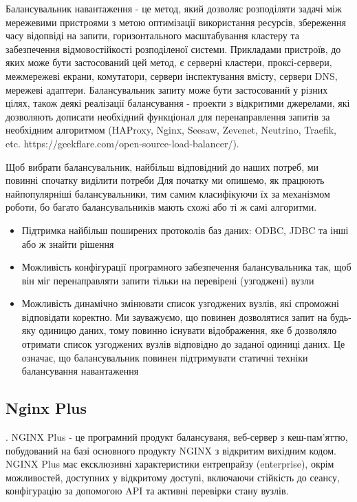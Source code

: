 \documentclass[14pt]{vakthesis}
\begin{document}
Балансувальник навантаження - це метод, який дозволяє розподіляти задачі між мережевими пристроями з метою оптимізації використання ресурсів, збереження часу відопвіді на запити, горизонтального масштабування кластеру та забезпечення відмовостійкості розподіленої системи. Прикладами пристроїв, до яких може бути застосований цей метод, є серверні кластери, проксі-сервери, межмережеві екрани, комутатори, сервери інспектування вмісту, сервери DNS, мережеві адаптери. Балансувальник запиту може бути застосований у різних цілях, також деякі реалізації балансування - проекти з відкритими джерелами, які дозволяють дописати необхідний функціонал для перенаправлення запитів за необхідним алгоритмом (HAProxy, Nginx, Seesaw, Zevenet, Neutrino, Traefik, etc. https://geekflare.com/open-source-load-balancer/).


Щоб вибрати балансувальник, найбільш відповідний до наших потреб, ми повинні спочатку виділити потреби Для початку ми опишемо, як працюють найпопулярніші балансувальники, тим самим класифікуючи їх за механізмом роботи, бо багато балансувальників мають схожі або ті ж самі алгоритми. 
\begin{itemize}
\item Підтримка найбільш поширених протоколів баз даних: ODBC, JDBC та інші або ж знайти рішення 
\item Можливість конфігурації програмного забезпечення балансувальника так, щоб він міг перенаправляти запити тільки на перевірені (узгоджені) вузли
\item Можливість динамічно змінювати список узгоджених вузлів, які спроможні відповідати коректно. Ми зауважуємо, що повинен дозволятися запит на будь-яку одиницю даних, тому повинно існувати відображення, яке б дозволяло отримати список узгоджених вузлів відповідно до заданої одиниці даних. Це означає, що балансувальник повинен підтримувати статичні техніки балансування навантаження
\end{itemize}



\subsection{Nginx Plus}. NGINX Plus - це програмний продукт балансуваня, веб-сервер з кеш-пам'яттю, побудований на базі основного продукту NGINX з відкритим вихідним кодом. NGINX Plus має ексклюзивні характеристики ентрепрайзу (enterprise), окрім можливостей, доступних у відкритому доступі, включаючи стійкість до сеансу, конфігурацію за допомогою API та активні перевірки стану вузлів. 
\end{document}
